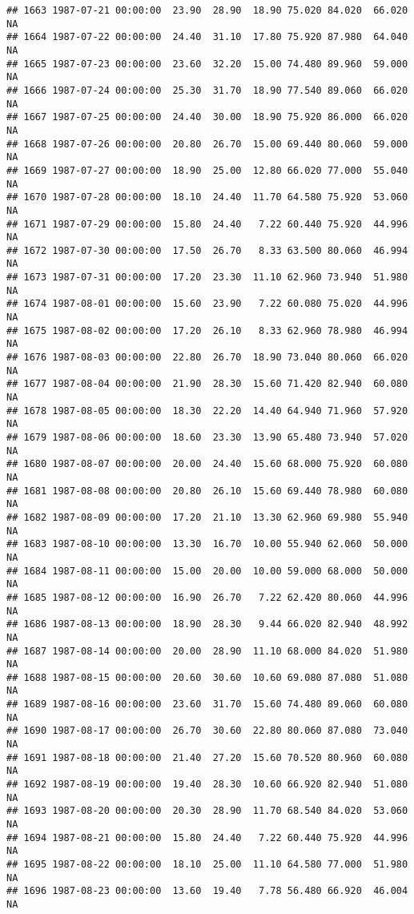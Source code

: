 \documentclass{article}\usepackage{graphicx, color}
\makeatletter
\newenvironment{kframe}{%
 \def\at@end@of@kframe{}%
 \ifinner\ifhmode%
  \def\at@end@of@kframe{\end{minipage}}%
  \begin{minipage}{\columnwidth}%
 \fi\fi%
 \def\FrameCommand##1{\hskip\@totalleftmargin \hskip-\fboxsep
 \colorbox{shadecolor}{##1}\hskip-\fboxsep
     \hskip-\linewidth \hskip-\@totalleftmargin \hskip\columnwidth}%
 \MakeFramed {\advance\hsize-\width
   \@totalleftmargin\z@ \linewidth\hsize
   \@setminipage}}%
 {\par\unskip\endMakeFramed%
 \at@end@of@kframe}
\newenvironment{knitrout}{}{} %
\makeatother
\begin{document}
\begin{knitrout}
\begin{kframe}
\begin{verbatim}
## 1663 1987-07-21 00:00:00  23.90  28.90  18.90 75.020 84.020  66.020     NA
## 1664 1987-07-22 00:00:00  24.40  31.10  17.80 75.920 87.980  64.040     NA
## 1665 1987-07-23 00:00:00  23.60  32.20  15.00 74.480 89.960  59.000     NA
## 1666 1987-07-24 00:00:00  25.30  31.70  18.90 77.540 89.060  66.020     NA
## 1667 1987-07-25 00:00:00  24.40  30.00  18.90 75.920 86.000  66.020     NA
## 1668 1987-07-26 00:00:00  20.80  26.70  15.00 69.440 80.060  59.000     NA
## 1669 1987-07-27 00:00:00  18.90  25.00  12.80 66.020 77.000  55.040     NA
## 1670 1987-07-28 00:00:00  18.10  24.40  11.70 64.580 75.920  53.060     NA
## 1671 1987-07-29 00:00:00  15.80  24.40   7.22 60.440 75.920  44.996     NA
## 1672 1987-07-30 00:00:00  17.50  26.70   8.33 63.500 80.060  46.994     NA
## 1673 1987-07-31 00:00:00  17.20  23.30  11.10 62.960 73.940  51.980     NA
## 1674 1987-08-01 00:00:00  15.60  23.90   7.22 60.080 75.020  44.996     NA
## 1675 1987-08-02 00:00:00  17.20  26.10   8.33 62.960 78.980  46.994     NA
## 1676 1987-08-03 00:00:00  22.80  26.70  18.90 73.040 80.060  66.020     NA
## 1677 1987-08-04 00:00:00  21.90  28.30  15.60 71.420 82.940  60.080     NA
## 1678 1987-08-05 00:00:00  18.30  22.20  14.40 64.940 71.960  57.920     NA
## 1679 1987-08-06 00:00:00  18.60  23.30  13.90 65.480 73.940  57.020     NA
## 1680 1987-08-07 00:00:00  20.00  24.40  15.60 68.000 75.920  60.080     NA
## 1681 1987-08-08 00:00:00  20.80  26.10  15.60 69.440 78.980  60.080     NA
## 1682 1987-08-09 00:00:00  17.20  21.10  13.30 62.960 69.980  55.940     NA
## 1683 1987-08-10 00:00:00  13.30  16.70  10.00 55.940 62.060  50.000     NA
## 1684 1987-08-11 00:00:00  15.00  20.00  10.00 59.000 68.000  50.000     NA
## 1685 1987-08-12 00:00:00  16.90  26.70   7.22 62.420 80.060  44.996     NA
## 1686 1987-08-13 00:00:00  18.90  28.30   9.44 66.020 82.940  48.992     NA
## 1687 1987-08-14 00:00:00  20.00  28.90  11.10 68.000 84.020  51.980     NA
## 1688 1987-08-15 00:00:00  20.60  30.60  10.60 69.080 87.080  51.080     NA
## 1689 1987-08-16 00:00:00  23.60  31.70  15.60 74.480 89.060  60.080     NA
## 1690 1987-08-17 00:00:00  26.70  30.60  22.80 80.060 87.080  73.040     NA
## 1691 1987-08-18 00:00:00  21.40  27.20  15.60 70.520 80.960  60.080     NA
## 1692 1987-08-19 00:00:00  19.40  28.30  10.60 66.920 82.940  51.080     NA
## 1693 1987-08-20 00:00:00  20.30  28.90  11.70 68.540 84.020  53.060     NA
## 1694 1987-08-21 00:00:00  15.80  24.40   7.22 60.440 75.920  44.996     NA
## 1695 1987-08-22 00:00:00  18.10  25.00  11.10 64.580 77.000  51.980     NA
## 1696 1987-08-23 00:00:00  13.60  19.40   7.78 56.480 66.920  46.004     NA

\end{verbatim}
\end{kframe}
\end{knitrout}
\end{document}
